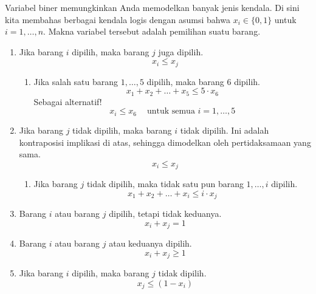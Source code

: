 Variabel biner memungkinkan Anda memodelkan banyak jenis kendala. Di sini kita membahas berbagai kendala logis dengan asumsi bahwa $x_i \in \{0,1\}$ untuk $i=1, \dots, n$. Makna variabel tersebut adalah pemilihan suatu barang.

\begin{enumerate}
 \item Jika barang $i$ dipilih, maka barang $j$ juga dipilih.
 \begin{equation}
 x_i \leq x_j
 \end{equation}
 \begin{enumerate}
 \item Jika salah satu barang $1, \dots, 5$ dipilih, maka barang $6$ dipilih.
 \begin{equation}
 x_1 + x_2 + \dots + x_5 \leq 5 \cdot x_6
 \end{equation}
 Sebagai alternatif!
 \begin{equation}
 x_i \leq x_6 \ \ \ \ \text{ untuk semua } i=1, \dots, 5
 \end{equation}
 \end{enumerate}
 \item Jika barang $j$ tidak dipilih, maka barang $i$ tidak dipilih. Ini adalah kontraposisi implikasi di atas, sehingga dimodelkan oleh pertidaksamaan yang sama.
 \begin{equation}
x_i \leq x_j
 \end{equation}
  \begin{enumerate}
 \item Jika barang $j$ tidak dipilih, maka tidak satu pun barang $1, \dots, i$ dipilih.
 \begin{equation}
 x_1 + x_2 + \dots + x_i \leq i \cdot x_j
 \end{equation}
 \end{enumerate}
\item Barang $i$ atau barang $j$ dipilih, tetapi tidak keduanya.
 \begin{equation}
 x_i + x_j = 1
 \end{equation}
\item Barang $i$ atau barang $j$ atau keduanya dipilih.
 \begin{equation}
 x_i + x_j \geq 1
 \end{equation}
\item Jika barang $i$ dipilih, maka barang $j$ tidak dipilih.
 \begin{equation}
x_j \leq (1-x_i)
 \end{equation}


\end{enumerate}
